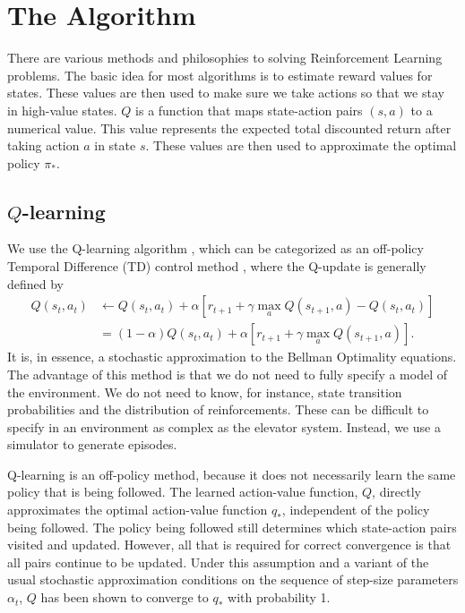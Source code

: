 \section{The Algorithm}

There are various methods and philosophies to solving Reinforcement Learning problems. The basic idea for most algorithms is to estimate reward values for states. These values are then used to make sure we take actions so that we stay in high-value states. $Q$ is a function that maps state-action pairs $(s, a)$ to a numerical value. This value represents the expected total discounted return after taking action $a$ in state $s$. These values are then used to approximate the optimal policy $\pi_*$.  

\subsection{$Q$-learning}

We use the Q-learning algorithm \cite{watkins_89}, which can be categorized as an off-policy Temporal Difference (TD) control method \cite{sutton_barto_2012}, where the Q-update is generally defined by
\begin{align}
    Q(s_t, a_t) &\leftarrow Q(s_t, a_t) + \alpha \left[ r_{t + 1} + \gamma \max\limits_a Q(s_{t + 1}, a) - Q(s_t, a_t) \right]\\
    &= (1 - \alpha) Q(s_t, a_t) + \alpha \left[r_{t + 1} + \gamma \max\limits_a Q(s_{t+1}, a) \right]. \label{eq:q_update_discrete}
\end{align}
It is, in essence, a stochastic approximation to the Bellman Optimality equations.  %
The advantage of this method is that we do not need to fully specify a model of the environment. We do not need to know, for instance, state transition probabilities and the distribution of reinforcements. These can be difficult to specify in an environment as complex as the elevator system. Instead, we use a simulator to generate episodes.

Q-learning is an off-policy method, because it does not necessarily learn the same policy that is being followed. The learned action-value function, $Q$, directly approximates the optimal action-value function $q_*$, independent of the policy being followed. The policy being followed still determines which state-action pairs visited and updated. However, all that is required for correct convergence is that all pairs continue to be updated. Under this assumption and a variant of the usual stochastic approximation conditions on the sequence
of step-size parameters $\alpha_t$, $Q$ has been shown to converge to $q_*$ with probability 1.

